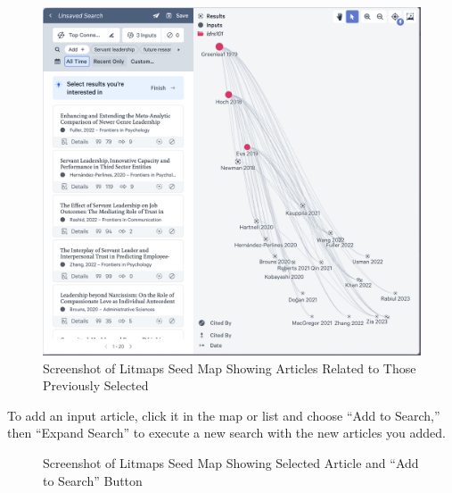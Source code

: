 \documentclass[
  letterpaper,
  DIV=11,
  numbers=noendperiod]{scrreprt}
\begin{document}
\begin{figure}

\caption{\label{fig-litmaps9}Screenshot of Litmaps Seed Map Showing
Articles Related to Those Previously Selected}

\includegraphics{assets/u2/litmaps9.png}

\end{figure}%

To add an input article, click it in the map or list and choose ``Add to
Search,'' then ``Expand Search'' to execute a new search with the new
articles you added.

\begin{figure}

\caption{\label{fig-litmaps10}Screenshot of Litmaps Seed Map Showing
Selected Article and ``Add to Search'' Button}


\end{figure}%
\end{document}
